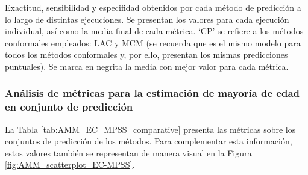 \begin{table}[h]
    \caption[
        Exactitud, sensibilidad y especifidad obtenidos por cada método de predicción a lo largo de distintas ejecuciones. 
    ]{   
        Exactitud, sensibilidad y especifidad obtenidos por cada método de predicción a lo largo de distintas ejecuciones. Se presentan los valores para cada ejecución individual, así como la media final de cada métrica.
        `CP' se refiere a los métodos conformales empleados: LAC y MCM (se recuerda que es el mismo modelo para todos los métodos conformales y, por ello, presentan los mismas predicciones puntuales). Se marca en negrita la media con mejor valor para cada métrica. 
    }
    \label{tab:AMM_accuracy_comparative}
\end{table}


\FloatBarrier


\subsubsection{Análisis de métricas para la estimación de mayoría de edad en conjunto de predicción}

La Tabla \ref{tab:AMM_EC_MPSS_comparative} presenta las métricas sobre los conjuntos de predicción de los métodos. Para complementar esta información, estos valores también se representan de manera visual en la Figura \ref{fig:AMM_scatterplot_EC-MPSS}.


